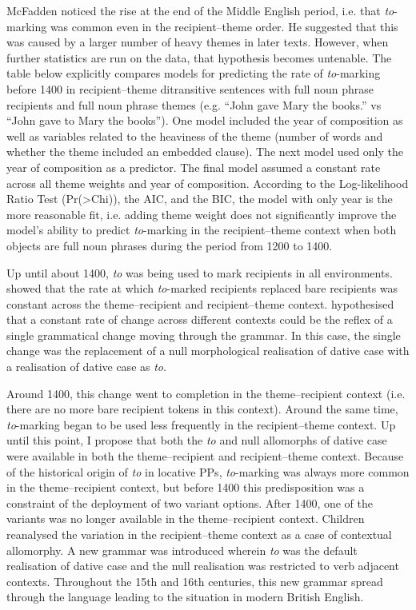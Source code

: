 McFadden noticed the rise at the end of the Middle English period, i.e. that \textit{to}-marking was common even in the recipient--theme order. He suggested that this was caused by a larger number of heavy themes in later texts. However, when further statistics are run on the data, that hypothesis becomes untenable. The table below explicitly compares models for predicting the rate of \textit{to}-marking before 1400 in recipient--theme ditransitive sentences with full noun phrase recipients and full noun phrase themes (e.g. ``John gave Mary the books.'' vs ``John gave to Mary the books''). One model included the year of composition as well as variables related to the heaviness of the theme (number of words and whether the theme included an embedded clause). The next model used only the year of composition as a predictor. The final model assumed a constant rate across all theme weights and year of composition. According to the Log-likelihood Ratio Test (Pr(>Chi)), the AIC, and the BIC, the model with only year is the more reasonable fit, i.e. adding theme weight does not significantly improve the model's ability to predict \textit{to}-marking in the recipient--theme context when both objects are full noun phrases during the period from 1200 to 1400.



Up until about 1400, \textit{to} was being used to mark recipients in all environments. \cite{Bacovcin.2016} showed that the rate at which \textit{to}-marked recipients replaced bare recipients was constant across the theme--recipient and recipient--theme context. \cite{Kroch.1989} hypothesised that a constant rate of change across different contexts could be the reflex of a single grammatical change moving through the grammar. In this case, the single change was the replacement of a null morphological realisation of dative case with a realisation of dative case as \textit{to}. 

Around 1400, this change went to completion in the theme--recipient context (i.e. there are no more bare recipient tokens in this context). Around the same time, \textit{to}-marking began to be used less frequently in the recipient--theme context. Up until this point, I propose that both the \textit{to} and null allomorphs of dative case were available in both the theme--recipient and recipient--theme context. Because of the historical origin of \textit{to} in locative PPs, \textit{to}-marking was always more common in the theme--recipient context, but before 1400 this predisposition was a constraint of the deployment of two variant options. After 1400, one of the variants was no longer available in the theme--recipient context. Children reanalysed the variation in the recipient--theme context as a case of contextual allomorphy. A new grammar was introduced wherein \textit{to} was the default realisation of dative case and the null realisation was restricted to verb adjacent contexts. Throughout the 15th and 16th centuries, this new grammar spread through the language leading to the situation in modern British English.

